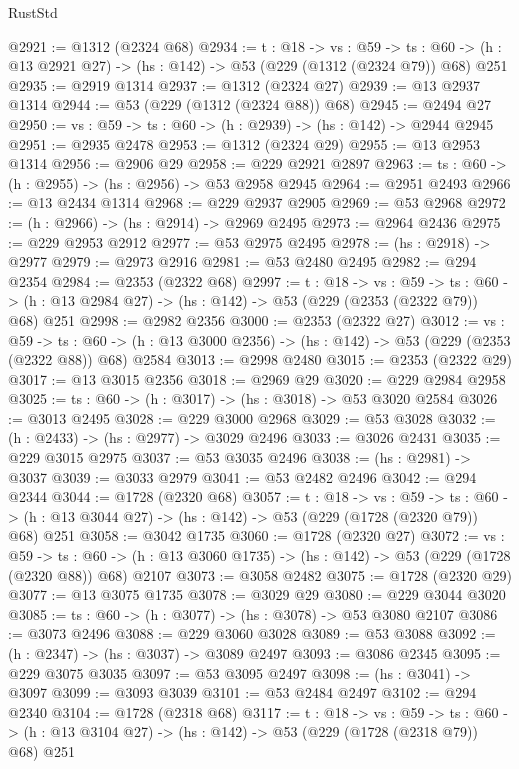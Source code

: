 \begin{lexlean}{RustStd}
\begin{coremodule}
@2921 := @1312 (@2324 @68)
@2934 := {t : @18} ->
  {vs : @59} ->
  {ts : @60} -> (h : @13 @2921 @27) -> (hs : @142) -> @53 (@229 (@1312 (@2324 @79)) @68) @251
@2935 := @2919 @1314
@2937 := @1312 (@2324 @27)
@2939 := @13 @2937 @1314
@2944 := @53 (@229 (@1312 (@2324 @88)) @68)
@2945 := @2494 @27
@2950 := {vs : @59} -> {ts : @60} -> (h : @2939) -> (hs : @142) -> @2944 @2945
@2951 := @2935 @2478
@2953 := @1312 (@2324 @29)
@2955 := @13 @2953 @1314
@2956 := @2906 @29
@2958 := @229 @2921 @2897
@2963 := {ts : @60} -> (h : @2955) -> (hs : @2956) -> @53 @2958 @2945
@2964 := @2951 @2493
@2966 := @13 @2434 @1314
@2968 := @229 @2937 @2905
@2969 := @53 @2968
@2972 := (h : @2966) -> (hs : @2914) -> @2969 @2495
@2973 := @2964 @2436
@2975 := @229 @2953 @2912
@2977 := @53 @2975 @2495
@2978 := (hs : @2918) -> @2977
@2979 := @2973 @2916
@2981 := @53 @2480 @2495
@2982 := @294 @2354
@2984 := @2353 (@2322 @68)
@2997 := {t : @18} ->
  {vs : @59} ->
  {ts : @60} -> (h : @13 @2984 @27) -> (hs : @142) -> @53 (@229 (@2353 (@2322 @79)) @68) @251
@2998 := @2982 @2356
@3000 := @2353 (@2322 @27)
@3012 := {vs : @59} ->
  {ts : @60} -> (h : @13 @3000 @2356) -> (hs : @142) -> @53 (@229 (@2353 (@2322 @88)) @68) @2584
@3013 := @2998 @2480
@3015 := @2353 (@2322 @29)
@3017 := @13 @3015 @2356
@3018 := @2969 @29
@3020 := @229 @2984 @2958
@3025 := {ts : @60} -> (h : @3017) -> (hs : @3018) -> @53 @3020 @2584
@3026 := @3013 @2495
@3028 := @229 @3000 @2968
@3029 := @53 @3028
@3032 := (h : @2433) -> (hs : @2977) -> @3029 @2496
@3033 := @3026 @2431
@3035 := @229 @3015 @2975
@3037 := @53 @3035 @2496
@3038 := (hs : @2981) -> @3037
@3039 := @3033 @2979
@3041 := @53 @2482 @2496
@3042 := @294 @2344
@3044 := @1728 (@2320 @68)
@3057 := {t : @18} ->
  {vs : @59} ->
  {ts : @60} -> (h : @13 @3044 @27) -> (hs : @142) -> @53 (@229 (@1728 (@2320 @79)) @68) @251
@3058 := @3042 @1735
@3060 := @1728 (@2320 @27)
@3072 := {vs : @59} ->
  {ts : @60} -> (h : @13 @3060 @1735) -> (hs : @142) -> @53 (@229 (@1728 (@2320 @88)) @68) @2107
@3073 := @3058 @2482
@3075 := @1728 (@2320 @29)
@3077 := @13 @3075 @1735
@3078 := @3029 @29
@3080 := @229 @3044 @3020
@3085 := {ts : @60} -> (h : @3077) -> (hs : @3078) -> @53 @3080 @2107
@3086 := @3073 @2496
@3088 := @229 @3060 @3028
@3089 := @53 @3088
@3092 := (h : @2347) -> (hs : @3037) -> @3089 @2497
@3093 := @3086 @2345
@3095 := @229 @3075 @3035
@3097 := @53 @3095 @2497
@3098 := (hs : @3041) -> @3097
@3099 := @3093 @3039
@3101 := @53 @2484 @2497
@3102 := @294 @2340
@3104 := @1728 (@2318 @68)
@3117 := {t : @18} ->
  {vs : @59} ->
  {ts : @60} -> (h : @13 @3104 @27) -> (hs : @142) -> @53 (@229 (@1728 (@2318 @79)) @68) @251

\end{coremodule}
\end{lexlean}
